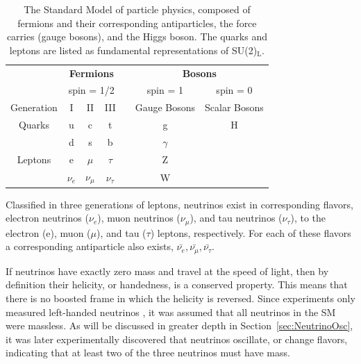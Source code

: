 
\begin{table}
	\centering
\begin{tabular}{|c|c|c|c|c|c|c|}
	\hline 
	& \multicolumn{3}{c|}{\textbf{Fermions}} & & \multicolumn{2}{c|}{\textbf{Bosons}}  \\ 
	& \multicolumn{3}{c|}{spin = 1/2} & & spin = 1 & spin = 0 \\
	\hline 
	Generation & I & II & III & & Gauge Bosons & Scalar Bosons \\ 
	\hline 
	Quarks & u & c & t & & g & H \\ 
	& d & s & b & & $\gamma$ &  \\ 
	Leptons & e & $\mu$ & $\tau$ & &  Z &  \\ 
	& $\nu_{e}$ & $\nu_{\mu}$ & $\nu_{\tau}$ & & W &  \\ 
	\hline 
\end{tabular}
\caption[The Standed Model of Particle Physics]{The Standard Model of particle physics, composed of fermions and their corresponding antiparticles, the force carries (gauge bosons), and the Higgs boson. The quarks and leptons are listed as fundamental representations of SU(2)$_\textrm{L}$.}
\label{tab:SM}
\end{table}

Classified in three generations of leptons, neutrinos exist in corresponding flavors, electron neutrinos ($\nu_{e}$), muon neutrinos ($\nu_{\mu}$), and tau neutrinos ($\nu_{\tau}$), to the electron (e), muon ($\mu$), and tau ($\tau$) leptons, respectively.
For each of these flavors a corresponding antiparticle also exists, $\bar{\nu_e}, \bar{\nu_\mu}, \bar{\nu_\tau}$.

If neutrinos have exactly zero mass and travel at the speed of light, then by definition their helicity, or handedness, is a conserved property. 
This means that there is no boosted frame in which the helicity is reversed.
Since experiments only measured left-handed neutrinos \cite{PhysRev.109.1015}, it was assumed that all neutrinos in the SM were massless.
As will be discussed in greater depth in Section~\ref{sec:NeutrinoOsc}, it was later experimentally discovered that neutrinos oscillate, or change flavors, indicating that at least two of the three neutrinos must have mass.

